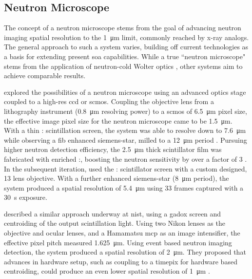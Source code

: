 \documentclass[../../../main.tex]{subfiles}%
\begin{document}
%
    \subsection{Neutron Microscope}%
    \label{sec:chapter-2:advanced-detectors:neutron-microscope}%
    The concept of a neutron microscope stems from the goal of advancing neutron imaging spatial resolution to the \SI{1}{\micro\meter} limit, commonly reached by \gls{x-ray} analogs.
    The general approach to such a system varies, building off current technologies as a basis for extending present \gls{soa} capabilities.
    While a true ``neutron microscope" stems from the application of \gls{neutron-cold} Wolter optics \cite{Hussey_2018}, other systems aim to achieve comparable results.
    \par%
    \citeauthor*{Trtik_2015} explored the possibilities of a neutron microscope using an advanced optics stage coupled to a \gls{high-res} \gls{ccd} or \gls{scmos}.
    Coupling the objective lens from a lithography instrument (\SI{0.8}{\micro\meter} resolving power) to a \gls{scmos} of \SI{6.5}{\micro\meter} pixel size, the effective image pixel size for the neutron microscope came to be \SI{1.5}{\micro\meter}.
    With a thin : scintillation screen, the system was able to resolve down to \SI{7.6}{\micro\meter} while observing a \gls{fib} enhanced \gls{siemens-star}, milled to a \SI{12}{\micro\meter} period \cite{Trtik_2015}.
    Pursuing higher neutron detection efficiency, the \SI{2.5}{\micro\meter} thick scintillator film was fabricated with  enriched :, boosting the neutron sensitivity by over a factor of \num{3} \cite{Trtik_2015a}.
    In the subsequent iteration, \citeauthor*{Trtik_2016} used the : scintillator screen with a custom designed, 13 lens objective.
    With a further enhanced \gls{siemens-star} (\SI{8}{\micro\meter} period), the system produced a spatial resolution of \SI{5.4}{\micro\meter} using \num{33} frames captured with a \SI{30}{\second} exposure.
    \par%
    \citeauthor*{Hussey_2017} described a similar approach underway at \gls{nist}, using a \gls{gadox} screen and centroiding of the output scintillation light.
    Using two Nikon lenses as the objective and ocular lenses, and a Hamamatsu \gls{mcp} as an image intensifier, the effective pixel pitch measured \SI{1.625}{\micro\meter}.
    Using event based neutron imaging detection, the system produced a spatial resolution of \SI{2}{\micro\meter}.    
    They proposed that advances in hardware setup, such as coupling to a \gls{timepix} for hardware based centroiding, could produce an even lower spatial resolution of \SI{1}{\micro\meter} \cite{Hussey_2017}.
\end{document}
